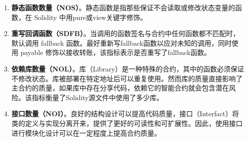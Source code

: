 \begin{enumerate}[label=\Alph*., align=left, leftmargin=*]
    \item \textbf{静态函数数量（NOS）}。静态函数是指那些保证不会读取或修改状态变量的函数，在 Solidity 中用pure或view关键字修饰。
    \item \textbf{重写回调函数（SDFB）}。当调用的函数签名与合约中任何函数都不匹配时，默认调用 fallback 函数。最好重新写fallback函数以应对未知的调用，同时使用 payable 修饰以接收转账，该指标表示是否重写了fallback函数。
    \item \textbf{依赖库数量（NOL）}。库（Library）是一种特殊的合约，其中的函数必须保证不修改状态。库被部署在特定地址后可以重复使用。然而库的质量直接影响了主合约的质量，如果库中存在分享代码，依赖它的智能合约就会包含潜在风险。该指标衡量了Solidity源文件中使用了多少库。
    \item \textbf{接口数量（NOI）}。良好的结构设计可以提高代码质量，接口（Interfact）将类的定义与实现分离开来，提供了更好的可读性和可扩展性。因此，使用接口进行模块化设计可以在一定程度上提高合约质量。
\end{enumerate}


